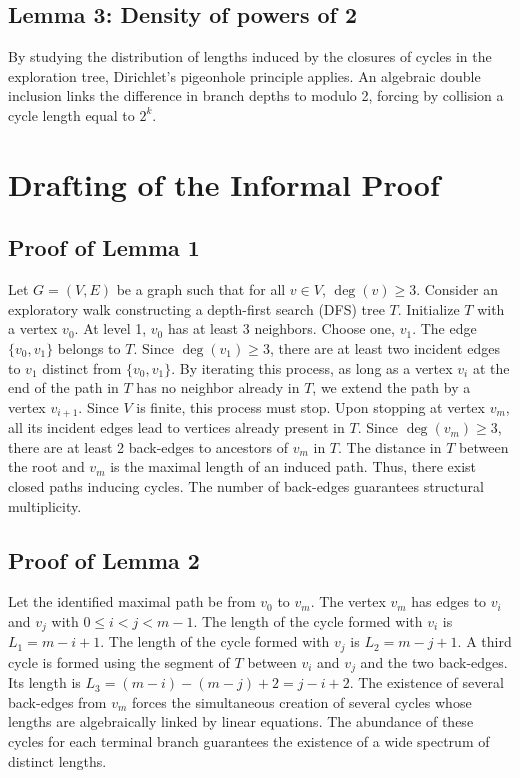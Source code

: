 \documentclass[11pt,a4paper]{article}
\begin{document}
\subsection{Lemma 3: Density of powers of 2}
By studying the distribution of lengths induced by the closures of cycles in the exploration tree, Dirichlet's pigeonhole principle applies. An algebraic double inclusion links the difference in branch depths to modulo 2, forcing by collision a cycle length equal to $2^k$.

\section{Drafting of the Informal Proof}

\subsection{Proof of Lemma 1}
Let $G = (V,E)$ be a graph such that for all $v \in V$, $\deg(v) \geq 3$.
Consider an exploratory walk constructing a depth-first search (DFS) tree $T$.
Initialize $T$ with a vertex $v_0$.
At level 1, $v_0$ has at least 3 neighbors. Choose one, $v_1$. The edge $\{v_0, v_1\}$ belongs to $T$.
Since $\deg(v_1) \geq 3$, there are at least two incident edges to $v_1$ distinct from $\{v_0, v_1\}$.
By iterating this process, as long as a vertex $v_i$ at the end of the path in $T$ has no neighbor already in $T$, we extend the path by a vertex $v_{i+1}$.
Since $V$ is finite, this process must stop. Upon stopping at vertex $v_m$, all its incident edges lead to vertices already present in $T$.
Since $\deg(v_m) \geq 3$, there are at least 2 back-edges to ancestors of $v_m$ in $T$.
The distance in $T$ between the root and $v_m$ is the maximal length of an induced path. Thus, there exist closed paths inducing cycles. The number of back-edges guarantees structural multiplicity.

\subsection{Proof of Lemma 2}
Let the identified maximal path be from $v_0$ to $v_m$.
The vertex $v_m$ has edges to $v_i$ and $v_j$ with $0 \leq i < j < m-1$.
The length of the cycle formed with $v_i$ is $L_1 = m - i + 1$.
The length of the cycle formed with $v_j$ is $L_2 = m - j + 1$.
A third cycle is formed using the segment of $T$ between $v_i$ and $v_j$ and the two back-edges. Its length is $L_3 = (m - i) - (m - j) + 2 = j - i + 2$.
The existence of several back-edges from $v_m$ forces the simultaneous creation of several cycles whose lengths are algebraically linked by linear equations. The abundance of these cycles for each terminal branch guarantees the existence of a wide spectrum of distinct lengths.
\end{document}
